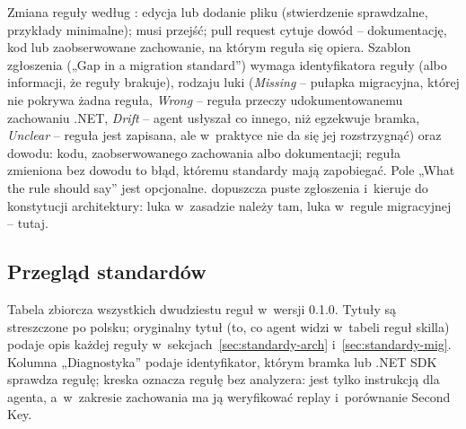 Zmiana reguły według : edycja lub dodanie pliku (stwierdzenie
sprawdzalne, przykłady minimalne);  musi przejść; pull request cytuje
dowód -- dokumentację, kod lub zaobserwowane zachowanie, na którym reguła się opiera.
Szablon zgłoszenia  („Gap in a migration
standard”) wymaga identyfikatora reguły (albo informacji, że reguły brakuje), rodzaju luki
(\emph{Missing} -- pułapka migracyjna, której nie pokrywa żadna reguła, \emph{Wrong} --
reguła przeczy udokumentowanemu zachowaniu .NET, \emph{Drift} -- agent usłyszał co innego,
niż egzekwuje bramka, \emph{Unclear} -- reguła jest zapisana, ale w~praktyce nie da się jej
rozstrzygnąć) oraz dowodu: kodu, zaobserwowanego zachowania albo dokumentacji; reguła
zmieniona bez dowodu to błąd, któremu standardy mają zapobiegać. Pole „What the rule should
say” jest opcjonalne.  dopuszcza puste zgłoszenia
i~kieruje do konstytucji architektury: luka w~zasadzie należy tam, luka w~regule
migracyjnej -- tutaj.


\subsection{Przegląd standardów}\label{sec:standardy-przeglad}

Tabela zbiorcza wszystkich dwudziestu reguł w~wersji 0.1.0. Tytuły są streszczone po polsku;
oryginalny tytuł (to, co agent widzi w~tabeli reguł skilla) podaje opis każdej reguły
w~sekcjach~\ref{sec:standardy-arch} i~\ref{sec:standardy-mig}. Kolumna „Diagnostyka” podaje
identyfikator, którym bramka lub .NET SDK sprawdza regułę; kreska oznacza regułę bez
analyzera: jest tylko instrukcją dla agenta, a~w~zakresie zachowania ma ją weryfikować replay
i~porównanie Second Key.

